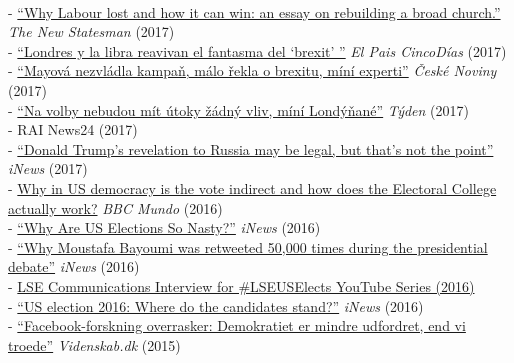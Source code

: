 \documentclass[12pt]{article}
\newcommand{\topic}[1]{\pagebreak[3]\indent {\color{lg}{\footnotesize #1 }}\\}
\newcommand{\subentry}[1]{{\color{lg}-} #1\vspace{.25em}\\}
\begin{document}
	\topic{Media Coverage and Interviews}
        \subentry{\href{http://www.newstatesman.com/politics/uk/2017/07/why-labour-lost-and-how-it-can-win-essay-rebuilding-broad-church}{``Why Labour lost and how it can win: an essay on rebuilding a broad church.''} \textit{The New Statesman} (2017)}
		\subentry{\href{https://cincodias.elpais.com/cincodias/2017/06/07/mercados/1496862592_391146.html}{``Londres y la libra reavivan el fantasma del `brexit' ''} \textit{El Pais CincoD\'{i}as} (2017)}
        \subentry{\href{http://www.ceskenoviny.cz/zpravy/mayova-nezvladla-kampan-malo-rekla-o-brexitu-mini-experti/1494511}{``Mayov\'{a} nezvl\'{a}dla kampa\v{n}, m\'{a}lo \v{r}ekla o brexitu, m\'{i}n\'{i} experti''} \textit{\v{C}esk\'{e} Noviny} (2017)}
        \subentry{\href{http://www.tyden.cz/rubriky/zahranici/evropa/na-volby-nebudou-mit-utoky-zadny-vliv-mini-londynane_433320.html}{``Na volby nebudou m\'{i}t \'{u}toky \v{z}\'{a}dn\'{y} vliv, m\'{i}n\'{i} Lond\'{y}\v{n}an\'{e}''} \textit{T\'{y}den} (2017)}
		\subentry{RAI News24 (2017)}
        \subentry{\href{https://inews.co.uk/essentials/news/world/donald-trumps-revelations-russia-may-legal-thats-not-point/}{``Donald Trump's revelation to Russia may be legal, but that's not the point''} \textit{iNews} (2017)}
        \subentry{\href{http://www.bbc.com/mundo/noticias-internacional-37701880}{Why in US democracy is the vote indirect and how does the Electoral College actually work?} \textit{BBC Mundo} (2016)}
		\subentry{\href{https://inews.co.uk/essentials/news/world/us-elections-nasty/}{``Why Are US Elections So Nasty?''} \textit{iNews} (2016)}
		\subentry{\href{https://inews.co.uk/essentials/news/world/moustafa-bayoumi-retweeted-50000-presidential-debate/}{``Why Moustafa Bayoumi was retweeted 50,000 times during the presidential debate''} \textit{iNews} (2016)}
		\subentry{\href{https://www.youtube.com/watch?v=Hwm5V6H_qog&list=PLK4elntcUEy1a8P47lFQDg1oHoNq1BdYk&index=20}{LSE Communications Interview for \#LSEUSElects YouTube Series (2016)}}
		\subentry{\href{https://inews.co.uk/explainers/iq/candidates-stand-us-election-2016/}{``US election 2016: Where do the candidates stand?''} \textit{iNews} (2016)}
		\subentry{\href{http://videnskab.dk/kultur-samfund/facebook-forskning-overrasker-demokratiet-er-mindre-udfordret-end-vi-troede}{``Facebook-forskning overrasker: Demokratiet er mindre udfordret, end vi troede''} \textit{Videnskab.dk} (2015)}
	
\end{document}

